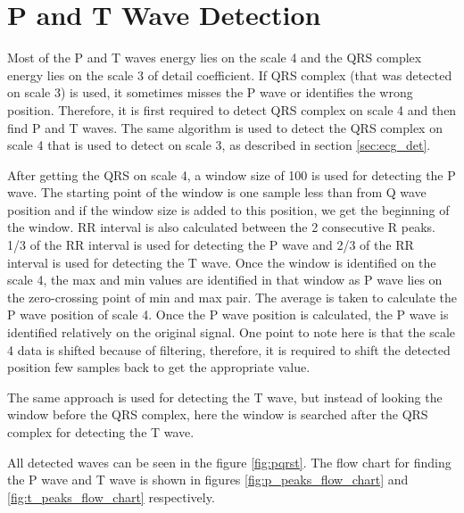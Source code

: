 \section{P and T Wave Detection}
Most of the P and T waves energy lies on the scale 4 and the QRS complex energy lies on the scale 3 of detail coefficient. If QRS complex (that was detected on scale 3) is used, it sometimes misses the P wave or identifies the wrong position. Therefore, it is first required to detect QRS complex on scale 4 and then find P and T waves. The same algorithm is used to detect the QRS complex on scale 4 that is used to detect on scale 3, as described in section \ref{sec:ecg_det}.

After getting the QRS on scale 4, a window size of 100 is used for detecting the P wave. The starting point of the window is one sample less than from Q wave position and if the window size is added to this position, we get the beginning of the window. RR interval is also calculated between the 2 consecutive R peaks. 1/3 of the RR interval is used for detecting the P wave and 2/3 of the RR interval is used for detecting the T wave. Once the window is identified on the scale 4, the max and min values are identified in that window as P wave lies on the zero-crossing point of min and max pair. The average is taken to calculate the P wave position of scale 4. Once the P wave position is calculated, the P wave is identified relatively on the original signal. One point to note here is that the scale 4 data is shifted because of filtering, therefore, it is required to shift the detected position few samples back to get the appropriate value.

The same approach is used for detecting the T wave, but instead of looking the window before the QRS complex, here the window is searched after the QRS complex for detecting the T wave.

All detected waves can be seen in the figure \ref{fig:pqrst}. The flow chart for finding the P wave and T wave is shown in figures \ref{fig:p_peaks_flow_chart} and \ref{fig:t_peaks_flow_chart} respectively.


